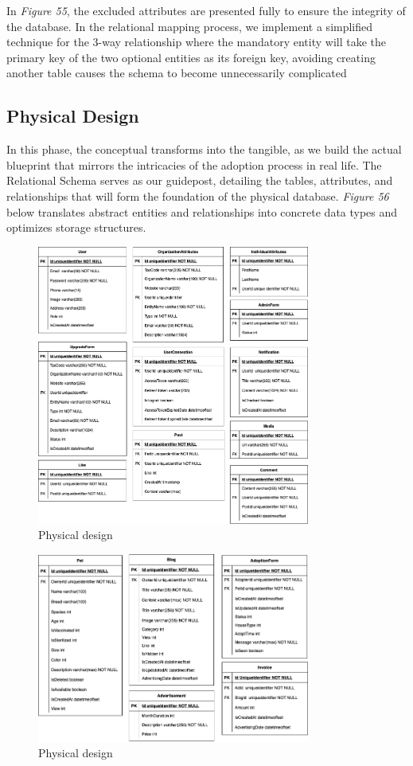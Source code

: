 In \emph{Figure 55}, the excluded attributes are presented fully to
ensure the integrity of the database. In the relational mapping process,
we implement a simplified technique for the 3-way relationship where the
mandatory entity will take the primary key of the two optional entities
as its foreign key, avoiding creating another table causes the schema to
become unnecessarily complicated

\subsection{Physical Design}

In this phase, the conceptual transforms into the tangible, as we build the actual blueprint that mirrors the intricacies of the adoption process in real life. The Relational Schema serves as our guidepost, detailing the tables, attributes, and relationships that will form the foundation of the physical database. \textit{Figure 56} below translates abstract entities and relationships into concrete data types and optimizes storage structures.

\begin {figure}[H]
\centering
\includegraphics[width=0.8\textwidth]{Figures/DatabaseDesign/Entities-Physical_1.png}
\caption{Physical design}
\end{figure}

\begin {figure}[H]
\centering
\includegraphics[width=0.8\textwidth]{Figures/DatabaseDesign/Entities-Physical_2.png}
\caption{Physical design}
\end{figure}




